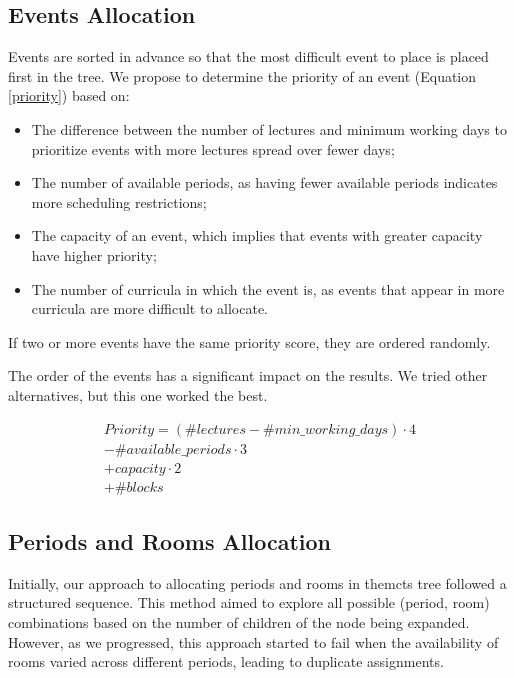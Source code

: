 \subsection{Events Allocation}

Events are sorted in advance so that the most difficult event to place is placed first in the tree. We propose to determine the priority of an event (Equation \ref{priority}) based on:

\begin{itemize}
\item The difference between the number of lectures and minimum working days to prioritize events with more lectures spread over fewer days;
\item The number of available periods, as having fewer available periods indicates more scheduling restrictions;
\item The capacity of an event, which implies that events with greater capacity have higher priority;
\item The number of curricula in which the event is, as events that appear in more curricula are more difficult to allocate.
\end{itemize}

If two or more events have the same priority score, they are ordered randomly.

The order of the events has a significant impact on the results. We tried other alternatives, but this one worked the best. 

\begin{equation}
  \begin{aligned}
	Priority = (\#lectures - \#min\_working\_days) \cdot 4 \\
	           - \#available\_periods \cdot 3 \\
	          + capacity \cdot 2 \\
	          + \#blocks\label{priority}
  \end{aligned}
\end{equation}


\subsection{Periods and Rooms Allocation}

Initially, our approach to allocating periods and rooms in the\ac{mcts} tree followed a structured sequence. This method aimed to explore all possible (period, room) combinations based on the number of children of the node being expanded. However, as we progressed, this approach started to fail when the availability of rooms varied across different periods, leading to duplicate assignments. 

